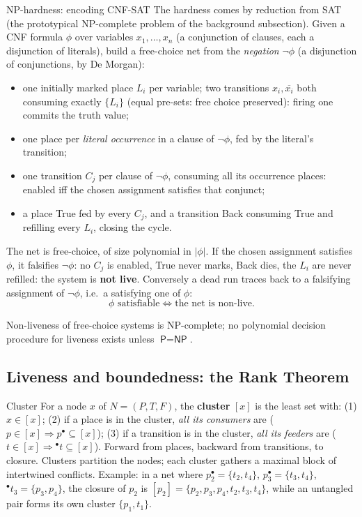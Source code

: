 \begin{notebox}{NP-hardness: encoding CNF-SAT}
The hardness comes by reduction from SAT (the prototypical \textsf{NP}-complete problem of the background subsection). Given a CNF formula $\phi$ over variables $x_1, \ldots, x_n$ (a conjunction of clauses, each a disjunction of literals), build a free-choice net from the \emph{negation} $\neg\phi$ (a disjunction of conjunctions, by De Morgan):
\begin{itemize}
  \item one initially marked place $L_i$ per variable; two transitions $x_i, \overline{x_i}$ both consuming exactly $\{L_i\}$ (equal pre-sets: free choice preserved): firing one commits the truth value;
  \item one place per \emph{literal occurrence} in a clause of $\neg\phi$, fed by the literal's transition;
  \item one transition $C_j$ per clause of $\neg\phi$, consuming all its occurrence places: enabled iff the chosen assignment satisfies that conjunct;
  \item a place \textsf{True} fed by every $C_j$, and a transition \textsf{Back} consuming \textsf{True} and refilling every $L_i$, closing the cycle.
\end{itemize}
The net is free-choice, of size polynomial in $|\phi|$. If the chosen assignment satisfies $\phi$, it falsifies $\neg\phi$: no $C_j$ is enabled, \textsf{True} never marks, \textsf{Back} dies, the $L_i$ are never refilled: the system is \textbf{not live}. Conversely a dead run traces back to a falsifying assignment of $\neg\phi$, i.e.\ a satisfying one of $\phi$:
\[
  \phi \text{ satisfiable} \iff \text{the net is non-live}.
\]
\end{notebox}

\begin{theorem}
Non-liveness of free-choice systems is \textsf{NP}-complete; no polynomial decision procedure for liveness exists unless $\textsf{P} = \textsf{NP}$.
\end{theorem}

\subsection{Liveness and boundedness: the Rank Theorem}

\begin{definitionbox}{Cluster}
For a node $x$ of $N = (P, T, F)$, the \textbf{cluster} $[x]$ is the least set with: (1) $x \in [x]$; (2) if a place is in the cluster, \emph{all its consumers} are ($p \in [x] \Rightarrow p^\bullet \subseteq [x]$); (3) if a transition is in the cluster, \emph{all its feeders} are ($t \in [x] \Rightarrow {}^\bullet t \subseteq [x]$). Forward from places, backward from transitions, to closure. Clusters partition the nodes; each cluster gathers a maximal block of intertwined conflicts. Example: in a net where $p_2^\bullet = \{t_2, t_4\}$, $p_3^\bullet = \{t_3, t_4\}$, ${}^\bullet t_3 = \{p_3, p_4\}$, the closure of $p_2$ is $[p_2] = \{p_2, p_3, p_4, t_2, t_3, t_4\}$, while an untangled pair forms its own cluster $\{p_1, t_1\}$.
\end{definitionbox}

